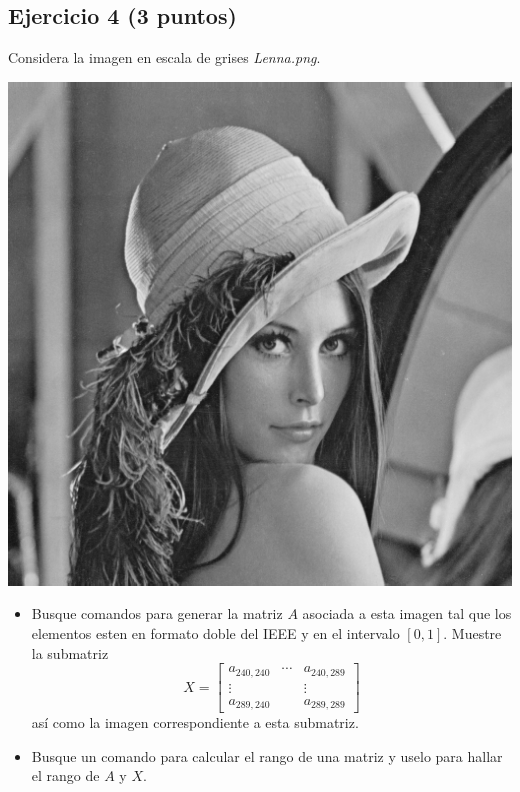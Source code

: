 \documentclass[11pt]{article}
\makeatletter
\def\maxwidth{\ifdim\Gin@nat@width>\linewidth\linewidth
    \else\Gin@nat@width\fi}
\let\Oldincludegraphics\includegraphics
\renewcommand{\includegraphics}[1]{\Oldincludegraphics[width=.8\maxwidth]{#1}}
\providecommand{\tightlist}{%
      \setlength{\itemsep}{0pt}\setlength{\parskip}{0pt}}
\makeatother
\begin{document}
    \subsection{Ejercicio 4 (3 puntos)}\label{ejercicio-4}

 Considera la imagen en escala de grises \emph{Lenna.png}.

     \begin{center}
     \includegraphics{Lenna.png} 
     \end{center} 

\begin{itemize}
\tightlist
\item
   Busque comandos para generar la matriz \(A\) asociada a esta imagen
  tal que los elementos esten en formato doble del IEEE y en el
  intervalo \([0,1]\). Muestre la submatriz \[X = \begin{bmatrix} 
     a_{240,240} & \cdots & a_{240,289} \\
     \vdots & & \vdots \\
     a_{289,240} & & a_{289,289}
     \end{bmatrix}\] así como la imagen correspondiente a esta
  submatriz.
\end{itemize}

    \begin{itemize}
\tightlist
\item
   Busque un comando para calcular el rango de una matriz y uselo para
  hallar el rango de \(A\) y \(X\). 
\end{itemize}
\end{document}
